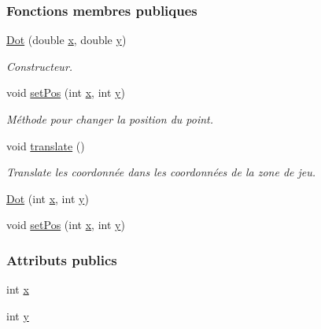\subsubsection*{Fonctions membres publiques}
\begin{DoxyCompactItemize}
\item 
\hyperlink{classSuchi_1_1Dot_a99f165eacf645707bc10cdbda82c2d09}{Dot} (double \hyperlink{classSuchi_1_1Dot_a4abd47b4ec16a1542ad3b75ddc1d760c}{x}, double \hyperlink{classSuchi_1_1Dot_aae7adce7564961a6fed16af1d2857b8b}{y})
\begin{DoxyCompactList}\small\item\em Constructeur. \end{DoxyCompactList}\item 
void \hyperlink{classSuchi_1_1Dot_acd41112feb44645d2801d7161f8dd0fc}{set\+Pos} (int \hyperlink{classSuchi_1_1Dot_a4abd47b4ec16a1542ad3b75ddc1d760c}{x}, int \hyperlink{classSuchi_1_1Dot_aae7adce7564961a6fed16af1d2857b8b}{y})
\begin{DoxyCompactList}\small\item\em Méthode pour changer la position du point. \end{DoxyCompactList}\item 
void \hyperlink{classSuchi_1_1Dot_ae154c81b917dba659ec91bf3ce3ac7be}{translate} ()
\begin{DoxyCompactList}\small\item\em Translate les coordonnée dans les coordonnées de la zone de jeu. \end{DoxyCompactList}\item 
\hyperlink{classSuchi_1_1Dot_aa62b79fe9f80948dce52747bcc009ac8}{Dot} (int \hyperlink{classSuchi_1_1Dot_a4abd47b4ec16a1542ad3b75ddc1d760c}{x}, int \hyperlink{classSuchi_1_1Dot_aae7adce7564961a6fed16af1d2857b8b}{y})
\item 
void \hyperlink{classSuchi_1_1Dot_acd41112feb44645d2801d7161f8dd0fc}{set\+Pos} (int \hyperlink{classSuchi_1_1Dot_a4abd47b4ec16a1542ad3b75ddc1d760c}{x}, int \hyperlink{classSuchi_1_1Dot_aae7adce7564961a6fed16af1d2857b8b}{y})
\end{DoxyCompactItemize}
\subsubsection*{Attributs publics}
\begin{DoxyCompactItemize}
\item 
int \hyperlink{classSuchi_1_1Dot_a4abd47b4ec16a1542ad3b75ddc1d760c}{x}
\item 
int \hyperlink{classSuchi_1_1Dot_aae7adce7564961a6fed16af1d2857b8b}{y}
\end{DoxyCompactItemize}


